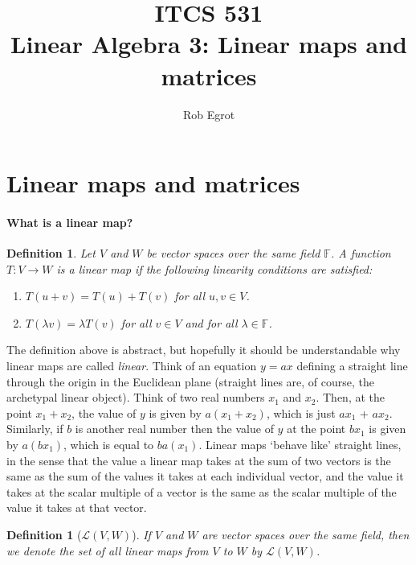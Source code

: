 \documentclass{article}
\title{ITCS 531 \\Linear Algebra 3: Linear maps and matrices}
\author{Rob Egrot}
\date{}
\theoremstyle{plain}
\newtheorem{definition}[theorem]{Definition}{\bfseries}{\upshape}
\newcommand{\bF}{\mathbb{F}}
\newcommand{\cL}{\mathcal{L}}
\begin{document}
\maketitle
\section{Linear maps and matrices}
\paragraph{What is a linear map?}

\begin{definition}\label{D:LA3map}
Let $V$ and $W$ be vector spaces over the same field $\bF$. A function $T:V\to W$ is a \emph{linear map} if the following linearity conditions are satisfied:
\begin{enumerate}
\item $T(u+v) = T(u) + T(v)$ for all $u,v\in V$.
\item $T(\lambda v)= \lambda T(v)$ for all $v\in V$ and for all $\lambda\in\bF$.
\end{enumerate}
\end{definition}

The definition above is abstract, but hopefully it should be understandable why linear maps are called \emph{linear}. Think of an equation $y = ax$ defining a straight line through the origin in the Euclidean plane (straight lines are, of course, the archetypal linear object). Think of two real numbers $x_1$ and $x_2$. Then, at the point $x_1+ x_2$, the value of $y$ is given by $a(x_1+x_2)$, which is just $ax_1$ + $ax_2$. Similarly, if $b$ is another real number then the value of $y$ at the point $bx_1$ is given by $a(bx_1)$, which is equal to $ba(x_1)$. Linear maps `behave like' straight lines, in the sense that the value a linear map takes at the sum of two vectors is the same as the sum of the values it takes at each individual vector, and the value it takes at the scalar multiple of a vector is the same as the scalar multiple of the value it takes at that vector.

\begin{definition}[$\cL(V,W)$]
If $V$ and $W$ are vector spaces over the same field, then we denote the set of all linear maps from $V$ to $W$ by $\cL(V,W)$.
\end{definition}
\end{document}
